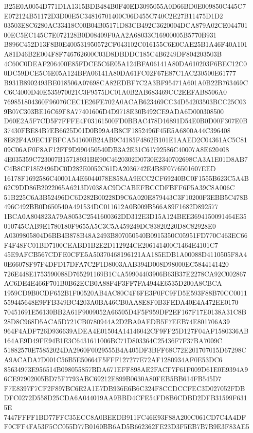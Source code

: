\documentclass[UTF8,fontset=fandol,zihao=-4,a4paper]{ctexart}
\begin{document}
{{B25E0A0054D771D1A1315BDB484B0F40ED3095055A0D66BD0E009850C445C7E072124B51172D3D00E5C34816701400C06D455C740C2E27B11475D1D2
03503E8C6280AC33418C00B04B05171D83CB492C3620004DCA879A02CE04470100EC5EC145C7E072128B0D08409F0AA2A68033C16900005B5770B931
B896C452D13F8B0E400531950572CF043102C016155C6E0CAE25B1A46F40A101A81D46B2E004F8F746762600C03D8DBDDC185C4B6249DF804203503B
4C60C0DEAF206400E85FDCE5C6E05A124BFA06141A80DA610203F6BEC12C00DC59DCE5C6E05A124BFA06141A80DA61FC02F67E87C1AC230500E61777
B931B8902493BE018506A07698CA82EDBF7C2A3BF95471A601A0B22B763469CC6C4000D40E535970021C3F9575DC01A0B2AB683469CC2EEFAB8506A0
769851804360F96076CEC1E26FE702A0ACAB623469CC34D54203503BCC25C039B07C303BE16C69F8A77401606D4D9718E30B492CE9ADA6D000308500
D60E2A5F7CD5F7FFFE4F03161500FD0BBAC478D16891D54E0B0D00F307E0B37430FBE84B7EB6625D01D0B99A4B8CF1852496F45E5A6800A44C396408
8E82F4A9EC1FBFCA541600B24AB9C4185F4862B101E1AAED2C04361AC5C8109C06AF0F8AF12FF9D990450540DB3A2E31C61792586C40007A8E620408
4E035359C723007B15718931BE90C4620302D0730E2340702698CA3A1E01D8AB7C4B8CF1852496DC0D282E0052C61DA2036742E4B8F0776501607EED
16178F1692586C40001A4E6044078E858AA9ECC2CF69240BC0F1555B623C5A4B62C9DD86B2022065A6213D7038AC9DCABEFBCCDFBFF6F5A39C8A006C
51B225C6A3B52496DC6D282B00228D9C6A020E879443C3F10200F3EBB5C478B496C492BB0D650540A491534DC011612A0B009B566A89F1682D892577
1BCA0A804823A79A8053C2541600362DD312E3D15A124BEE3694150091464E35010745CAB9E1780180F9655A5C3C5A459249DC83820220D8C82928E0
A0309805804D6BB4B878B48A2493B807050540B0915350C05951FD770C463EC66F4F48FC01BD7100CEABD1B2E2D112924CE206141400C1464E4101C7
45E9AFCB567CDFE0CFE5A50370468196121AA185EDB1A00088D4110505F8A40E66078F97F4DFD17DFA7C2F1D8003AAB394D008D98000EC5844141420
726E448E1753590088D765291169B1C4A59904403906B63B37E2278CA92C002867AC6DE4E466F701B0B62ECB0A88F4F3FF7FA4944E6535D200A8CBCA
1959CD9B0CDF652B1F00520AB4AC80C4F6FE3F0FC9FD5E593F88B70CC0011559445648E9FFB349BC4203A0BA46CB0AA8E8F0B3FEDA40E4A472EE0170
70451691E56130BB2A61F9009052A66505D4F5F959DF2EF167F17E0138A31C8B28D8C968D5ACA5D721CB0780944A2D2BA0AEDB5F7EEB74E801706A39
964F4ADF726D936639ADEA4E01504A14146042CF9FF25D127F04AF1580336AB164AE9D49FE94B1E3C6431611006BC71D803364C25436F7F37BA7009C
51882570E75852024DA2960F0029555B4A405DF3BFF68C72E201707015D67298CA9ACADA7D001C56B5E50664F5FFF127277E72AF1280934AF0E53DC6
85634973E956514B098055857BDA671EFF898AE2FACF7F61F009D61E0E9394A96CE97902005BD75F7793ABC69212E899B0630A80FEB5BB614FB545D7
F7E8397F7CF2F897BC6E2A1E7DB936E6B6C324F8CCDCCFEC3D027052FDBDFC0272D558D25CDA6A044019AA9BBD4CFE54FD8B6CDBD2DFB31599F6315E
7447FFFF1BD77FFC35ECC8A0BEEDB911FC46E93F88A200C061CD7C4A4DFF0CFF4FA53F5CC055D77B0160BB6AD5B662362FE23D3F5EB7B7B9E3F83AE5
}}
\end{document}
